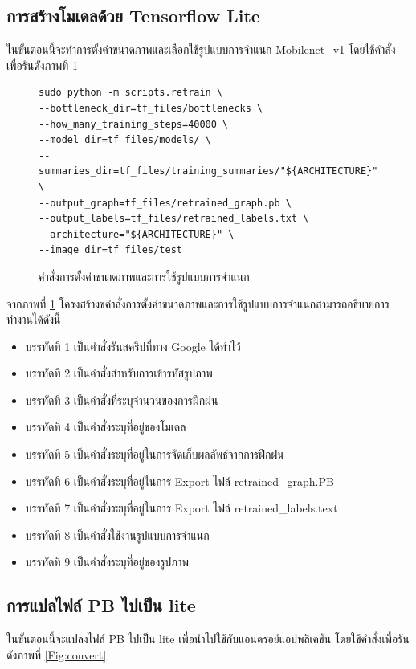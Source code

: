 	\subsection{การสร้างโมเดลด้วย Tensorflow Lite}
							ในขั้นตอนนี้จะทำการตั้งค่าขนาดภาพและเลือกใช้รูปแบบการจำแนก Mobilenet\_v1 โดยใช้คำสั่งเพื่อรันดังภาพที่ \ref{Fig:model}

\begin{figure}[H]
{\begin{lstlisting}
sudo python -m scripts.retrain \
--bottleneck_dir=tf_files/bottlenecks \
--how_many_training_steps=40000 \
--model_dir=tf_files/models/ \
--summaries_dir=tf_files/training_summaries/"${ARCHITECTURE}" \
--output_graph=tf_files/retrained_graph.pb \
--output_labels=tf_files/retrained_labels.txt \
--architecture="${ARCHITECTURE}" \
--image_dir=tf_files/test

\end{lstlisting}}
\caption{คำสั่งการตั้งค่าขนาดภาพและการใช้รูปแบบการจำแนก}
\label{Fig:model}
\end{figure}
\newpage




จากภาพที่ \ref{Fig:model} โครงสร้างขคำสั่งการตั้งค่าขนาดภาพและการใช้รูปแบบการจำแนกสามารถอธิบายการทำงานได้ดังนี้
\begin{itemize}[label={--}]
\item บรรทัดที่  1	     เป็นคำสั่งรันสคริปที่ทาง Google ได้ทำไว้
\item บรรทัดที่  2 	     เป็นคำสั่งสำหรับการเข้ารหัสรูปภาพ
\item บรรทัดที่  3       เป็นคำสั่งที่ระบุจำนวนของการฝึกฝน 
\item บรรทัดที่  4       เป็นคำสั่งระบุที่อยู่ของโมเดล 
\item บรรทัดที่  5       เป็นคำสั่งระบุที่อยู่ในการจัดเก็บผลลัพธ์จากการฝึกฝน
\item บรรทัดที่  6       เป็นคำสั่งระบุที่อยู่ในการ Export ไฟล์ retrained\_graph.PB 
\item บรรทัดที่  7       เป็นคำสั่งระบุที่อยู่ในการ Export ไฟล์ retrained\_labels.text 
\item บรรทัดที่  8       เป็นคำสั่งใช้งานรูปแบบการจำแนก
\item บรรทัดที่  9       เป็นคำสั่งระบุที่อยู่ของรูปภาพ
\end{itemize}
\subsection{การแปลไฟล์ PB ไปเป็น lite}
ในขั้นตอนนี้จะแปลงไฟล์ PB ไปเป็น lite เพื่อนำไปใช้กับแอนดรอย์แอปพลิเคชัน โดยใช้คำสั่งเพื่อรันดังภาพที่ \ref{Fig:convert}

